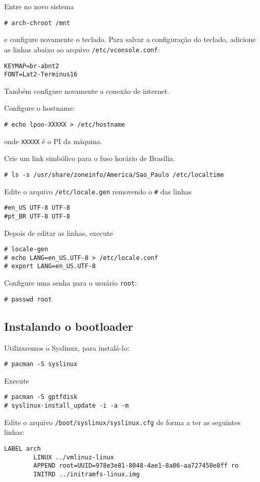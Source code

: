 \documentclass[A4paper]{article}
\begin{document}
Entre no novo sistema
\begin{lstlisting}
# arch-chroot /mnt
\end{lstlisting}
e configure novamente o teclado. Para salvar a configuração do teclado, adicione
as linhas abaixo ao arquivo \lstinline+/etc/vconsole.conf+:
\begin{lstlisting}
KEYMAP=br-abnt2
FONT=Lat2-Terminus16
\end{lstlisting}
Também configure novamente a conexão de internet.

Configure o hostname:
\begin{lstlisting}
# echo lpoo-XXXXX > /etc/hostname
\end{lstlisting}
onde \lstinline+XXXXX+ é o PI da máquina.

Crie um link simbólico para o fuso horário de Brasília.
\begin{lstlisting}
# ls -s /usr/share/zoneinfo/America/Sao_Paulo /etc/localtime
\end{lstlisting}

Edite o arquivo \lstinline+/etc/locale.gen+ removendo o \lstinline+#+ das linhas
\begin{lstlisting}
#en_US UTF-8 UTF-8
#pt_BR UTF-8 UTF-8
\end{lstlisting}
Depois de editar as linhas, execute
\begin{lstlisting}
# locale-gen
# echo LANG=en_US.UTF-8 > /etc/locale.conf
# export LANG=en_US.UTF-8
\end{lstlisting}

Configure uma senha para o usuário \lstinline+root+:
\begin{lstlisting}
# passwd root
\end{lstlisting}

\subsection{Instalando o bootloader}
Utilizaremos o Syslinux, para instalá-lo:
\begin{lstlisting}
# pacman -S syslinux
\end{lstlisting}

Execute
\begin{lstlisting}
# pacman -S gptfdisk
# syslinux-install_update -i -a -m
\end{lstlisting}

Edite o arquivo
\lstinline+/boot/syslinux/syslinux.cfg+ de forma a ter as seguintes linhas:
\begin{lstlisting}
LABEL arch
        LINUX ../vmlinuz-linux
        APPEND root=UUID=978e3e81-8048-4ae1-8a06-aa727458e8ff ro
        INITRD ../initramfs-linux.img
\end{lstlisting}
\end{document}
